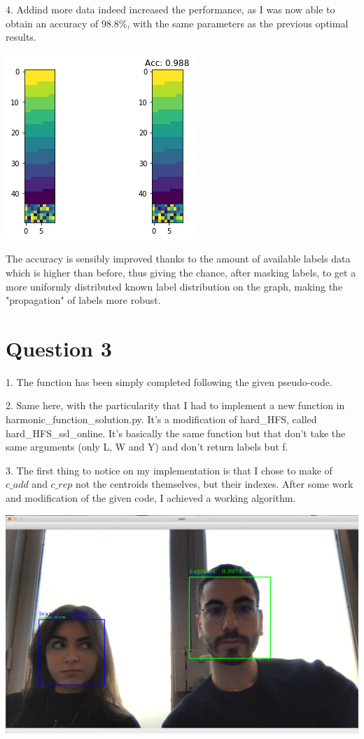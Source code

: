 \documentclass{article}
\begin{document}
4. Addind more data indeed increased the performance, as I was now able to obtain an accuracy of $98.8\%$, with the same parameters as the previous optimal results.
\begin{center}
	\includegraphics[scale=0.7]{6}
\end{center}

The accuracy is sensibly improved thanks to the amount of available labels data which is higher than before, thus giving the chance, after masking labels, to get a more uniformly distributed known label distribution on the graph, making the "propagation" of labels more robust.

\section{Question 3}
1. The function has been simply completed following the given pseudo-code.
\\ \newline

2. Same here, with the particularity that I had to implement a new function in harmonic\_function\_solution.py. It's a modification of hard\_HFS, called hard\_HFS\_ssl\_online. It's basically the same function but that don't take the same arguments (only L, W and Y) and don't return labels but f.
\\ \newline

3. The first thing to notice on my implementation is that I chose to make of $c\_add$ and $c\_rep$ not the centroids themselves, but their indexes.
After some work and modification of the given code, I achieved a working algorithm.


\begin{center}
	\includegraphics[scale=0.15]{0}
\end{center}
\end{document}
